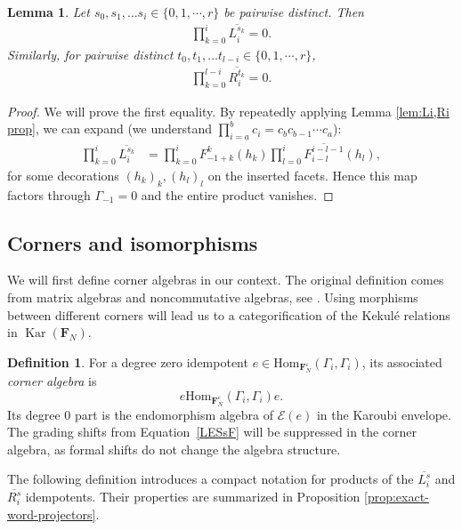 \documentclass[12pt]{amsart}
\newtheorem{lemma}[theorem]{Lemma}
\theoremstyle{definition}
\newtheorem{definition}[theorem]{Definition}
\theoremstyle{remark}
\numberwithin{equation}{section}
\numberwithin{figure}{section}
\newcommand{\Hom}{\mathrm{Hom}}
\newcommand{\Kar}{\operatorname{Kar}}
\newcommand{\Li}[2]{\overline{L^{#1}_{#2}}}
\newcommand{\Ri}[2]{\overline{R^{#1}_{#2}}}
\newcommand{\Foam}{\mathbf{F}_N}
\begin{document}
\begin{lemma}\label{lem:prod of Ri Li vanishing}
    Let $s_0, s_1, \ldots s_i \in \{0,1,\cdots, r\}$ be pairwise distinct. Then 
    \begin{align*}
        \prod_{k = 0}^i \Li{s_k}{i} = 0.
    \end{align*}
    Similarly, for pairwise distinct $t_0, t_1, \ldots t_{l-i} \in \{0,1,\cdots, r\}$,
    \begin{align*}
        \prod_{k = 0}^{l-i} \Ri{t_k}{i} = 0.
    \end{align*}
\end{lemma}
\begin{proof}
    We will prove the first equality. By repeatedly applying Lemma \ref{lem:Li,Ri prop}, we can expand (we understand $\prod_{i = a}^b c_i = c_b c_{b-1}\cdots c_a$):
    \begin{align*}
        \prod_{k = 0}^i \Li{s_k}{i} & = \prod_{k = 0}^i F_{-1 + k}^{k} (h_{k}) \prod_{l = 0}^i \overline{F_{i- l }^{i-l-1}}(h_l),
    \end{align*}
    for some decorations $(h_k)_k, (h_l)_l$ on the inserted facets. Hence this map factors through $\Gamma_{-1} = 0$ and the entire product vanishes.
\end{proof}

\subsection{Corners and isomorphisms}\label{sec:corner}

We will first define corner algebras in our context. The original definition comes from matrix algebras and noncommutative algebras, see \cite[Section 2.7]{Bresar2014}. Using morphisms between different corners will lead us to a categorification of the Kekulé relations in $\Kar(\Foam)$.

\begin{definition}\label{def:corner algebra}
    For a degree zero idempotent $e \in\Hom_{\Foam^\varepsilon}(\Gamma_i,\Gamma_i)$, its associated \emph{corner algebra} is
\[
 e\Hom_{\Foam^\varepsilon}(\Gamma_i,\Gamma_i)e.
\]
Its degree $0$ part is the endomorphism algebra of
$\mathcal{E}(e)$ in the Karoubi envelope. The grading shifts from Equation~\eqref{LESsF} will be suppressed in the corner algebra, as formal shifts do not change the algebra structure.
\end{definition}

The following definition introduces a compact notation for products of the $\Li{s}{i}$ and $\Ri{s}{i}$ idempotents. Their properties are summarized in Proposition \ref{prop:exact-word-projectors}. 
\end{document}

